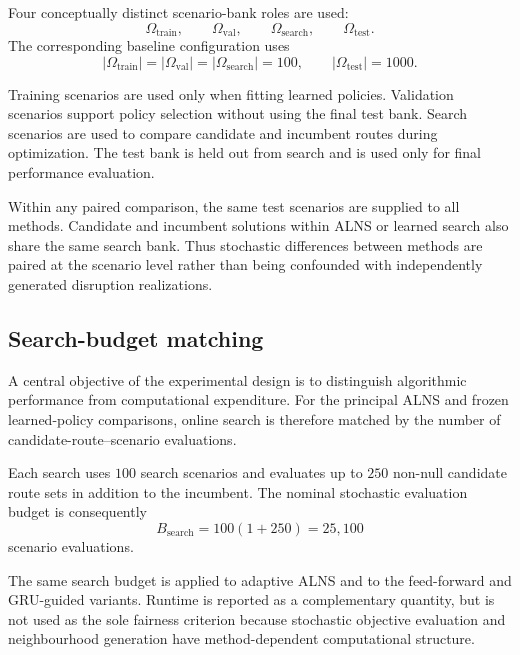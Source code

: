 \documentclass[preprint,12pt]{elsarticle}
\newcommand{\1}{\mathbf{1}}
\begin{document}
Four conceptually distinct scenario-bank roles are used:
\[
\Omega_{\mathrm{train}},
\qquad
\Omega_{\mathrm{val}},
\qquad
\Omega_{\mathrm{search}},
\qquad
\Omega_{\mathrm{test}}.
\]
The corresponding baseline configuration uses
\begin{equation}
	|\Omega_{\mathrm{train}}|
	=
	|\Omega_{\mathrm{val}}|
	=
	|\Omega_{\mathrm{search}}|
	=
	100,
	\qquad
	|\Omega_{\mathrm{test}}|
	=
	1000.
	\label{eq:scenario_bank_sizes}
\end{equation}

Training scenarios are used only when fitting learned policies.
Validation scenarios support policy selection without using the final test bank.
Search scenarios are used to compare candidate and incumbent routes during
optimization. The test bank is held out from search and is used only for final
performance evaluation.

Within any paired comparison, the same test scenarios are supplied to all
methods. Candidate and incumbent solutions within ALNS or learned search also
share the same search bank. Thus stochastic differences between methods are
paired at the scenario level rather than being confounded with independently
generated disruption realizations.

\subsection{Search-budget matching}
\label{subsec:fair_budget}

A central objective of the experimental design is to distinguish algorithmic
performance from computational expenditure. For the principal ALNS and frozen
learned-policy comparisons, online search is therefore matched by the number of
candidate-route--scenario evaluations.

Each search uses $100$ search scenarios and evaluates up to $250$ non-null
candidate route sets in addition to the incumbent. The nominal stochastic
evaluation budget is consequently
\begin{equation}
	B_{\mathrm{search}}
	=
	100(1+250)
	=
	25{,}100
	\label{eq:search_budget}
\end{equation}
scenario evaluations.

The same search budget is applied to adaptive ALNS and to the feed-forward and
GRU-guided variants. Runtime is reported as a complementary quantity, but is not
used as the sole fairness criterion because stochastic objective evaluation and
neighbourhood generation have method-dependent computational structure.
\end{document}
